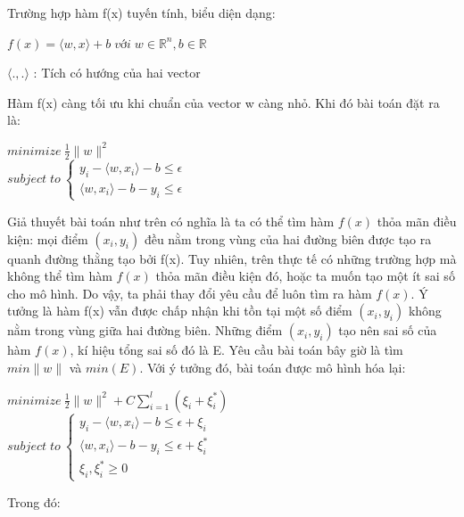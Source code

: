 \documentclass[12pt]{extarticle}
\begin{document}
				\par Trường hợp hàm f(x) tuyến tính, biểu diện dạng:
					\begin{center}
						$f(x)=\langle w,x\rangle + b \;với \;w\in \mathbb{R}^{n}, b\in \mathbb{R}$
						\par $\langle .,.\rangle$ : Tích có hướng của hai vector
					\end{center}
				\par Hàm f(x) càng tối ưu khi chuẩn của vector w càng nhỏ. Khi đó bài toán đặt ra là:
					\begin{center}
						$minimize \: \frac{1}{2}\parallel{w}\parallel^{2}$ \\
						$subject\; to \: \begin{cases}y_{i}-\langle w,x_{i}\rangle-b \leq \epsilon \\\langle w,x_{i}\rangle-b-y_{i} \leq \epsilon\end{cases}$
					\end{center}
				\par Giả thuyết bài toán như trên có nghĩa là ta có thể tìm hàm $f(x)$ thỏa mãn điều kiện: mọi điểm $(x_{i},y_{i})$ đều nằm trong vùng của hai đường biên được tạo ra quanh đường thằng tạo bởi f(x). Tuy nhiên, trên thực tế có những trường hợp mà không thể tìm hàm $f(x)$ thỏa mãn điều kiện đó, hoặc ta muốn tạo một ít sai số cho mô hình. Do vậy, ta phải thay đổi yêu cầu để luôn tìm ra hàm $f(x)$. Ý tưởng là hàm f(x) vẫn được chấp nhận khi tồn tại một số điểm $(x_{i},y_{i})$ không nằm trong vùng giữa hai đường biên. Những điểm $(x_{i},y_{i})$ tạo nên sai số của hàm $f(x)$, kí hiệu tổng sai số đó là E. Yêu cầu bài toán bây giờ là tìm $min \parallel w\parallel$ và $min(E)$. Với ý tưởng đó, bài toán được mô hình hóa lại:
					\begin{center}
						$minimize \: \frac{1}{2}\parallel{w}\parallel^{2} +C\sum_{i=1}^l(\xi_{i}+\xi_i^*)$ \\
						$subject\; to \: \begin{cases}y_{i}-\langle w,x_{i}\rangle-b \leq \epsilon + \xi_{i}\\\langle w,x_{i}\rangle-b-y_{i} \leq \epsilon+\xi_i^* \\ \xi_{i},\xi_i^* \geq0\end{cases}$
					\end{center}
				\par Trong đó:
\end{document}
